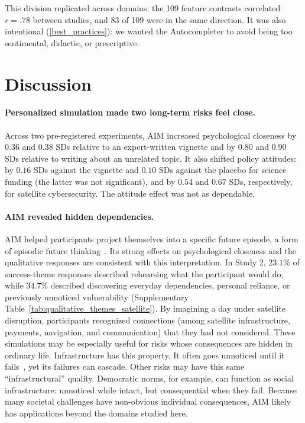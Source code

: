 \documentclass[11pt]{article}
\begin{document}
This division replicated across domains: the 109 feature contrasts correlated $r=.78$ between studies, and 83 of 109 were in the same direction. It was also intentional (\autoref{best_practices}): we wanted the Autocompleter to avoid being too sentimental, didactic, or prescriptive.



\section{Discussion}
\label{sec:discussion-content}
\label{sec:discussion}

\paragraph{Personalized simulation made two long-term risks feel close.} Across two pre-registered experiments, AIM increased psychological closeness by $0.36$ and $0.38$ SDs relative to an expert-written vignette and by $0.80$ and $0.90$ SDs relative to writing about an unrelated topic. It also shifted policy attitudes: by $0.16$ SDs against the vignette and $0.10$ SDs against the placebo for science funding (the latter was not significant), and by $0.54$ and $0.67$ SDs, respectively, for satellite cybersecurity. The attitude effect was not as dependable.

\paragraph{AIM revealed hidden dependencies.} AIM helped participants project themselves into a specific future episode, a form of episodic future thinking~\citep{atance_episodic_2001,szpunar_taxonomy_2014}. Its strong effects on psychological closeness and the qualitative responses are consistent with this interpretation. In Study 2, $23.1\%$ of success-theme responses described rehearsing what the participant would do, while $34.7\%$ described discovering everyday dependencies, personal reliance, or previously unnoticed vulnerability (Supplementary Table~\ref{tab:qualitative_themes_satellite}). By imagining a day under satellite disruption, participants recognized connections (among satellite infrastructure, payments, navigation, and communication) that they had not considered. These simulations may be especially useful for risks whose consequences are hidden in ordinary life. Infrastructure has this property. It often goes unnoticed until it fails~\cite{star_ethnography_1999}, yet its failures can cascade. Other risks may have this same ``infrastructural'' quality. Democratic norms, for example, can function as social infrastructure:  unnoticed while intact, but consequential when they fail. Because many societal challenges have non-obvious individual consequences, AIM likely has applications beyond the domains studied here.
\end{document}
